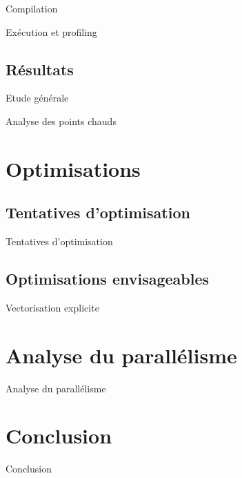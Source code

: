 \documentclass[9.5pt]{beamer}
\begin{document}
		\begin{frame}{Compilation}

		\end{frame}

		\begin{frame}{Exécution et profiling}
		
		\end{frame}

	\subsection{Résultats}
		\begin{frame}{Etude générale}
			
		\end{frame}

		\begin{frame}{Analyse des points chauds}
			
		\end{frame}

\section{Optimisations}
	\subsection{Tentatives d'optimisation}
		\begin{frame}{Tentatives d'optimisation}
		\end{frame}

	\subsection{Optimisations envisageables}
		\begin{frame}{Vectorisation explicite}
		\end{frame}

\section{Analyse du parallélisme}
	\begin{frame}{Analyse du parallélisme}
	\end{frame}

\section{Conclusion}
	\begin{frame}{Conclusion}
	\end{frame}
\end{document}
